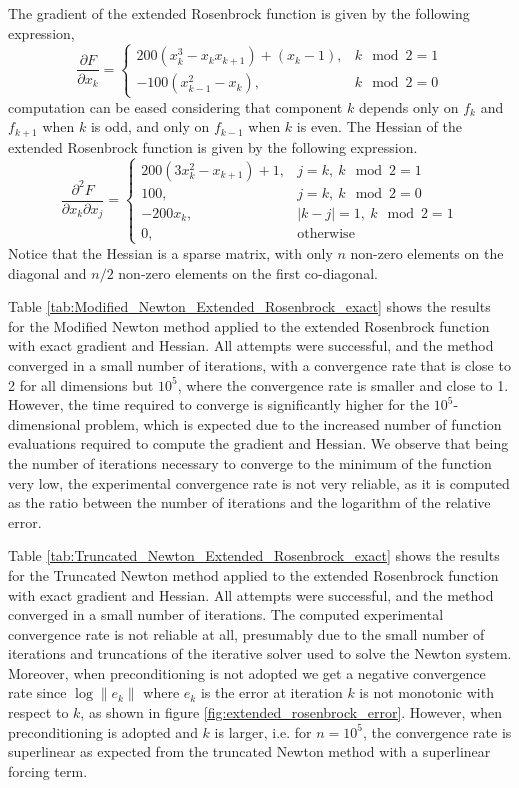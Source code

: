The gradient of the extended Rosenbrock function is given by the following expression,
\begin{equation}
    \frac{\partial F}{\partial x_k} = 
    \left \{ \begin{array}{ll}
    200(x_k^3 - x_kx_{k+1}) + (x_k - 1), & k\mod 2 = 1\\
    -100(x_{k-1}^2 - x_k), & k\mod 2 = 0
    \end{array} \right .
\end{equation}
computation can be eased considering that component $k$ depends only on $f_k$ and $f_{k+1}$ when $k$ is odd, and only on $f_{k-1}$ when $k$ is even.
The Hessian of the extended Rosenbrock function is given by the following expression.
\begin{equation}
    \frac{\partial^2 F}{\partial x_k \partial x_j} = 
    \left \{ \begin{array}{ll}
    200(3x_k^2 - x_{k+1}) + 1, & j = k,\ k\mod 2 = 1\\
    100, & j = k,\ k\mod 2 = 0\\
    -200x_k, & \lvert k-j \rvert = 1,\ k\mod 2 = 1\\
    0, & \text{otherwise}
    \end{array} \right .
\end{equation}
Notice that the Hessian is a sparse matrix, with only $n$ non-zero elements on the diagonal and $n/2$ non-zero elements on the first co-diagonal.

Table \ref{tab:Modified_Newton_Extended_Rosenbrock_exact} shows the results for the Modified Newton method applied to the extended Rosenbrock function with exact gradient and Hessian.
All attempts were successful, and the method converged in a small number of iterations, with a convergence rate that is close to 2 for all dimensions but $10^5$, where the convergence rate is smaller and close to 1.
However, the time required to converge is significantly higher for the $10^5$-dimensional problem, which is expected due to the increased number of function evaluations required to compute the gradient and Hessian.
We observe that being the number of iterations necessary to converge to the minimum of the function very low, the experimental convergence rate is not very reliable, as it is computed as the ratio between the number of iterations and the logarithm of the relative error.

Table \ref{tab:Truncated_Newton_Extended_Rosenbrock_exact} shows the results for the Truncated Newton method applied to the extended Rosenbrock function with exact gradient and Hessian.
All attempts were successful, and the method converged in a small number of iterations.
The computed experimental convergence rate is not reliable at all, presumably due to the small number of iterations and truncations of the iterative solver used to solve the Newton system.
Moreover, when preconditioning is not adopted we get a negative convergence rate since $\log \lVert e_k \rVert$ where $e_k$ is the error at iteration $k$ is not monotonic with respect to $k$, as shown in figure \ref{fig:extended_rosenbrock_error}.
However, when preconditioning is adopted and $k$ is larger, i.e. for $n = 10^5$, the convergence rate is superlinear as expected from the truncated Newton method with a superlinear forcing term.

